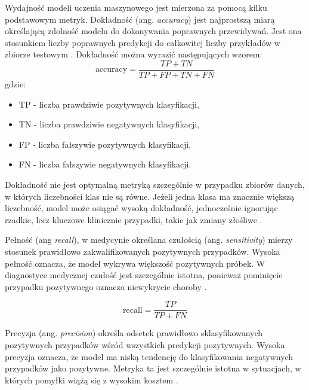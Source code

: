Wydajność modeli uczenia maszynowego jest mierzona za pomocą kilku podstawowym metryk.
Dokładność (ang. \textit{accuracy}) jest najprostszą miarą określającą zdolność modelu do dokonywania poprawnych przewidywań. 
Jest ona stosunkiem liczby poprawnych predykcji do całkowitej liczby przykładów w zbiorze testowym \cite{Rainio_2024, Erickson_Kitamura_2021, Grandini_Bagli_Visani_2020, Nowak_2022}.
Dokładność można wyrazić następujących wzorem:
\begin{equation}
	\text{accuracy} = \frac{TP+TN}{TP+FP+TN+FN}
\end{equation}
gdzie:

\begin{itemize}
	\item TP - liczba prawdziwie pozytywnych klasyfikacji,
	\item TN - liczba prawdziwie negatywnych klasyfikacji,
	\item FP - liczba fałszywie pozytywnych klasyfikacji,
	\item FN - liczba fałszywie negatywnych klasyfikacji.
\end{itemize}

Dokładność nie jest optymalną metryką szczególnie w przypadku zbiorów danych, w których liczebności klas nie są równe. 
Jeżeli jedna klasa ma znacznie większą liczebność, model może osiągać wysoką dokładność, jednocześnie ignorując rzadkie, lecz kluczowe klinicznie przypadki, takie jak zmiany złośliwe \cite{Grandini_Bagli_Visani_2020, Nowak_2022}.

Pełność (ang \textit{recall}), w medycynie określana czułością (ang. \textit{sensitivity}) mierzy stosunek prawidłowo zakwalifikowanych pozytywnych przypadków.
Wysoka pełność oznacza, że model wykrywa większość pozytywnych próbek.
W diagnostyce medycznej czułość jest szczególnie istotna, ponieważ pominięcie przypadku pozytywnego oznacza niewykrycie choroby \cite{Rainio_2024, Nowak_2022}. 

\begin{equation}
	\text{recall}=\frac{TP}{TP+FN}
\end{equation}

Precyzja (ang. \textit{precision}) określa odsetek prawidłowo sklasyfikowanych pozytywnych przypadków wśród wszystkich predykcji pozytywnych. 
Wysoka precyzja oznacza, że model ma niską tendencję do klasyfikowania negatywnych przypadków jako pozytywne.
Metryka ta jest szczególnie istotna w sytuacjach, w których pomyłki wiążą się z wysokim kosztem \cite{Rainio_2024, Erickson_Kitamura_2021, Nowak_2022}.


